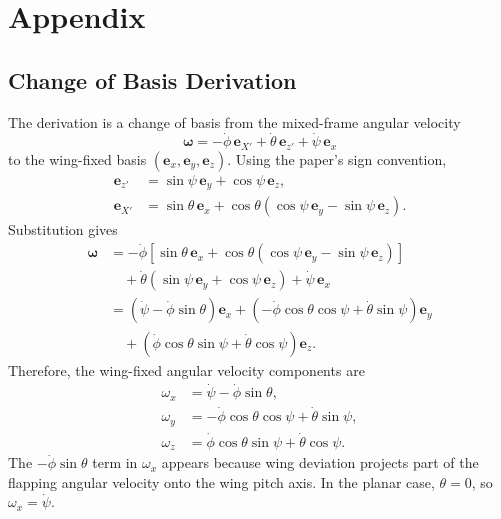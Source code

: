 \documentclass{article}
\begin{document}
\section{Appendix} 
\subsection{Change of Basis Derivation} 
\label{sec:change_of_basis_derivation}
The derivation is a change of basis from the mixed-frame angular velocity
\begin{equation}
    \boldsymbol{\omega}
    = -\dot{\phi}\,\mathbf{e}_{X'}
      + \dot{\theta}\,\mathbf{e}_{z'}
      + \dot{\psi}\,\mathbf{e}_x
\end{equation}
to the wing-fixed basis \((\mathbf{e}_x, \mathbf{e}_y, \mathbf{e}_z)\).
Using the paper's sign convention,
\begin{align}
    \mathbf{e}_{z'}
        &= \sin\psi\,\mathbf{e}_y + \cos\psi\,\mathbf{e}_z, \\
    \mathbf{e}_{X'}
        &= \sin\theta\,\mathbf{e}_x
           + \cos\theta
             \left(\cos\psi\,\mathbf{e}_y
             - \sin\psi\,\mathbf{e}_z\right).
\end{align}
Substitution gives
\begin{align}
    \boldsymbol{\omega}
        &= -\dot{\phi}
           \left[
             \sin\theta\,\mathbf{e}_x
             + \cos\theta
               \left(\cos\psi\,\mathbf{e}_y
               - \sin\psi\,\mathbf{e}_z\right)
           \right] \nonumber \\
        &\quad
           + \dot{\theta}
             \left(\sin\psi\,\mathbf{e}_y
             + \cos\psi\,\mathbf{e}_z\right)
           + \dot{\psi}\,\mathbf{e}_x \nonumber \\
        &= \left(\dot{\psi} - \dot{\phi}\sin\theta\right)\mathbf{e}_x
           + \left(-\dot{\phi}\cos\theta\cos\psi
             + \dot{\theta}\sin\psi\right)\mathbf{e}_y \nonumber \\
        &\quad
           + \left(\dot{\phi}\cos\theta\sin\psi
             + \dot{\theta}\cos\psi\right)\mathbf{e}_z .
\end{align}
Therefore, the wing-fixed angular velocity components are
\begin{align}
    \omega_x &= \dot{\psi} - \dot{\phi}\sin\theta, \\
    \omega_y &= -\dot{\phi}\cos\theta\cos\psi
                + \dot{\theta}\sin\psi, \\
    \omega_z &= \dot{\phi}\cos\theta\sin\psi
                + \dot{\theta}\cos\psi .
\end{align}
The \(-\dot{\phi}\sin\theta\) term in \(\omega_x\) appears because wing deviation projects part of the flapping angular velocity onto the wing pitch axis. In the planar case, \(\theta = 0\), so \(\omega_x = \dot{\psi}\).
\end{document}
